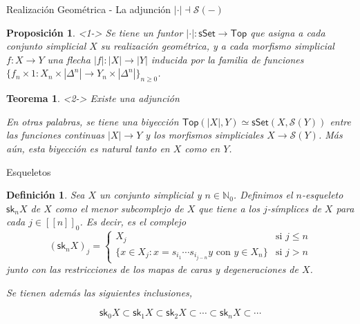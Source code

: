 \documentclass[11pt]{beamer}
\newcommand{\N}{\mathbb{N}}
\newcommand{\nat}[1]{[\![#1]\!]}
\newcommand{\natzero}[1]{\nat{#1}_0}
\newcommand{\cat}[1]{\mathsf{#1}}
\newcommand{\sk}{\mathsf{sk}}
\renewcommand{\ss}[1]{\Delta^{#1}}
\newtheorem{defs}{Definición}
\newtheorem{teo}{Teorema}
\newtheorem{prop}{Proposición}
\begin{document}
\begin{frame}{Realización Geométrica - La adjunción $| \cdot | \dashv \mathscr{S}(-)$}
\begin{prop} <1-> Se tiene un funtor  $| \cdot | : \cat{sSet} \to \cat{Top}$ que asigna a cada conjunto simplicial $X$ su realización geométrica, y a cada morfismo simplicial $f : X \to Y$ una flecha $|f| : |X| \to |Y|$ inducida por la familia de funciones $\{f_n \times 1 : X_n \times |\ss{n}| \to Y_n \times |\ss{n}|\}_{n\geq 0}$.
\end{prop}


\begin{teo} <2-> Existe una adjunción
\begin{center}
\end{center}
En otras palabras, se tiene una biyección $\cat{Top}(|X|,Y) \simeq \cat{sSet}(X,\mathscr{S}(Y))$ entre las funciones continuas $|X| \to Y$ y los morfismos simpliciales $X \to \mathscr{S}(Y)$. Más aún, esta biyección es natural tanto en $X$ como en $Y$.
\end{teo}
\end{frame}

\begin{frame}{Esqueletos}
\begin{defs} Sea $X$ un conjunto simplicial y $n \in \N_0$. Definimos el $n$-esqueleto $\sk_n X$ de $X$ como el menor subcomplejo de $X$ que tiene a los $j$-símplices de $X$ para cada $j \in \natzero{n}$. Es decir, es el complejo
\[
(\sk_nX)_j = \begin{cases}
X_j &\text{si $j \leq n$}\\
\{x \in X_j : x = s_{i_1} \cdots s_{i_{j-n}}y \text{ con } y \in X_n\} &\text{si $j > n$}
\end{cases}
\]
junto con las restricciones de los mapas de caras y degeneraciones de $X$. 

Se tienen además las siguientes inclusiones,
\end{defs}
\[
\sk_0X \subset \sk_1X \subset \sk_2X \subset \cdots \subset \sk_nX \subset \cdots
\]
\end{frame}
\end{document}
